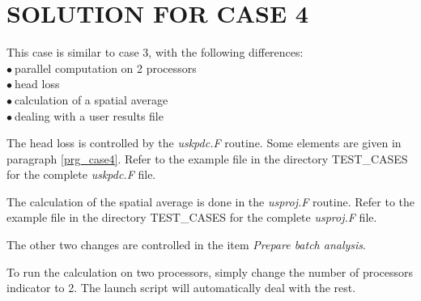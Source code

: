 %
% 
%
% 
% 
% 
%
\section{SOLUTION FOR CASE 4}
This case is similar to case 3, with the following differences:\\
\hspace*{1cm}$\bullet\ $parallel computation on 2 processors\\
\hspace*{1cm}$\bullet\ $head loss\\
\hspace*{1cm}$\bullet\ $calculation of a spatial average\\
\hspace*{1cm}$\bullet\ $dealing with a user results file

The head loss is controlled by the {\itshape uskpdc.F} routine. Some elements
are given in paragraph \ref{prg_case4}. Refer to the example file in the
directory TEST\_CASES for the complete {\itshape uskpdc.F} file.

The calculation of the spatial average is done in the {\itshape usproj.F}
routine. Refer to the example file in the
directory TEST\_CASES for the complete {\itshape usproj.F} file.

The other two changes are controlled in the item
{\itshape Prepare batch analysis}.

To run the calculation on two processors, simply change the number of processors
indicator to 2. The launch script will automatically deal with the rest.

